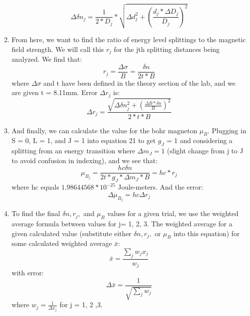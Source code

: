 \documentclass{article}
\begin{document}
\begin{enumerate}
\begin{equation}
            \Delta \delta n_j = \frac{1}{2*D_j}*\sqrt{\Delta d_j^2 + (\frac{d_j * \Delta D_j}{D_j})^2}
        \end{equation}
        \item From here, we want to find the ratio of energy level splittings to the magnetic field strength. We will call this $r_j$ for the jth splitting distances being analyzed. We find that:
        \begin{equation}
            r_j = \frac{\Delta \sigma}{B} = \frac{\delta n}{2t*B}
        \end{equation}
        where $\Delta \sigma$ and t have been defined in the theory section of the lab, and we are given t = 8.11mm. Error $\Delta r_j$ is: %
        \begin{equation}
            \Delta r_j = \frac{\sqrt{\Delta \delta n_j^2 + (\frac{\Delta B * \delta n}{B})^2}}{2*t*B}
        \end{equation}
        \item And finally, we can calculate the value for the bohr magneton $\mu_B$. Plugging in S = 0, L = 1, and J = 1 into equation 21 to get $g_J$ = 1 and considering a splitting from an energy transition where $\Delta m_J = 1$ (slight change from j to J to avoid confusion in indexing), and we see that:
        \begin{equation}
            \mu_{B_j} = \frac{hc\delta n}{2t*g_J*\Delta m_J*B} = hc * r_j
        \end{equation}
        where hc equals $1.98644568*10^{-25}$ Joule-meters. And the error:
        \begin{equation}
            \Delta \mu_{B_j} = hc \Delta r_j
        \end{equation}
        \item To find the final $\delta n, r_j,$ and $\mu_B$ values for a given trial, we use the weighted average formula between values for j= 1, 2, 3. The weighted average for a given calculated value (substitute either $\delta n, r_j,$ or $\mu_B$ into this equation) for some calculated weighted average $\bar{x}$:
        \begin{equation}
            \bar{x} = \frac{\sum_j w_j x_j}{w_j}
        \end{equation}
        with error:
        \begin{equation}
            \Delta \bar{x} = \frac{1}{\sqrt{\sum_j w_j}}
        \end{equation}
        where $w_j = \frac{1}{\Delta x_j}$ for j = 1, 2 ,3.
    \end{enumerate}
\end{document}
